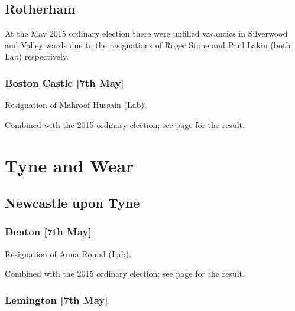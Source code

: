 \documentclass[a4paper,openany]{book}
\begin{document}
\begin{resultsiii}
\subsection*{Rotherham}

At the May 2015 ordinary election there were unfilled vacancies in Silverwood and Valley wards due to the resignations of Roger Stone and Paul Lakin (both Lab) respectively.

\subsubsection*{Boston Castle \hspace*{\fill}\nolinebreak[1]%
\enspace\hspace*{\fill}
[7th May]}


Resignation of Mahroof Hussain (Lab).

Combined with the 2015 ordinary election; see page \pageref{BostonCastleRotherham} for the result.

\section{Tyne and Wear}

\subsection*{Newcastle upon Tyne}

\subsubsection*{Denton \hspace*{\fill}\nolinebreak[1]%
\enspace\hspace*{\fill}
[7th May]}


Resignation of Anna Round (Lab).

Combined with the 2015 ordinary election; see page \pageref{DentonNewcastleTyne} for the result.

\subsubsection*{Lemington \hspace*{\fill}\nolinebreak[1]%
\enspace\hspace*{\fill}
[7th May]}


\end{resultsiii}
\end{document}
